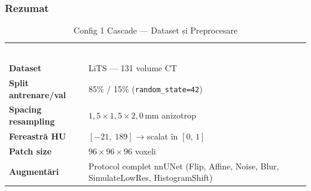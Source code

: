 \documentclass[12pt, a4paper]{report}
\begin{document}
\subsubsection*{Rezumat}

\begin{table}[H]
\centering
\renewcommand{\arraystretch}{1.3}
\caption{Config 1 Cascade — Dataset și Preprocesare}
\label{tab:config1_dataset}
\begin{tabular}{>{\bfseries}p{5.5cm} p{8.5cm}}
\multicolumn{2}{>{\columncolor{darkblue}}c}{%
    \textbf{\textcolor{white}{Dataset și Preprocesare}}} \\
\rowcolor{darkblue}
\textcolor{white}{Parametru} & \textcolor{white}{Valoare} \\
\rowcolor{lightblue} Dataset              & LiTS — 131 volume CT \\
\rowcolor{white}     Split antrenare/val  & 85\% / 15\%
                                            (\texttt{random\_state=42}) \\
\rowcolor{lightblue} Spacing resampling   & $1{,}5 \times 1{,}5 \times 2{,}0$\,mm
                                            anizotrop \\
\rowcolor{white}     Fereastră HU         & $[-21,\;189]$ → scalat în $[0,\,1]$ \\
\rowcolor{lightblue} Patch size           & $96 \times 96 \times 96$ voxeli \\
\rowcolor{white}     Augmentări           & Protocol complet nnUNet
                                            (Flip, Affine, Noise, Blur,
                                            SimulateLowRes, HistogramShift) \\
\end{tabular}
\end{table}

\vspace{6pt}
\end{document}
